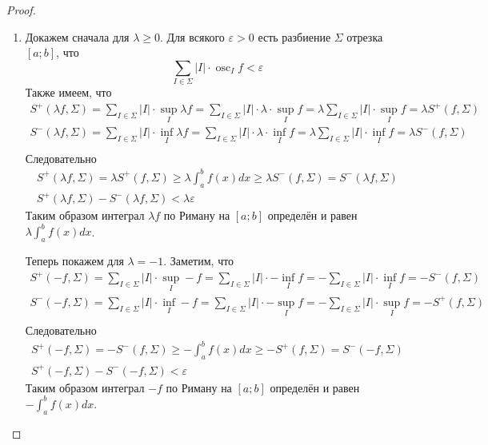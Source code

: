 \documentclass[12pt,a4paper]{article}
\DeclareMathOperator*{\osc}{osc}
\begin{document}
\begin{proof}
\begin{enumerate}
            \item Докажем сначала для $\lambda \geqslant 0$. Для всякого $\varepsilon > 0$ есть разбиение $\Sigma$ отрезка $[a; b]$, что
                \[\sum_{I \in \Sigma} |I| \cdot \osc_I f < \varepsilon\]
                Также имеем, что
                \begin{gather*}
                    S^+(\lambda f, \Sigma) = \sum_{I \in \Sigma} |I| \cdot \sup_I \lambda f = \sum_{I \in \Sigma} |I| \cdot \lambda \cdot \sup_I f = \lambda \sum_{I \in \Sigma} |I| \cdot \sup_I f = \lambda S^+(f, \Sigma)\\
                    S^-(\lambda f, \Sigma) = \sum_{I \in \Sigma} |I| \cdot \inf_I \lambda f = \sum_{I \in \Sigma} |I| \cdot \lambda \cdot \inf_I f = \lambda \sum_{I \in \Sigma} |I| \cdot \inf_I f = \lambda S^-(f, \Sigma)\\
                \end{gather*}
                Следовательно
                \begin{gather*}
                    S^+(\lambda f, \Sigma) = \lambda S^+(f, \Sigma) \geqslant \lambda \int_a^b f(x)dx \geqslant \lambda S^-(f, \Sigma) = S^-(\lambda f, \Sigma)\\
                    S^+(\lambda f, \Sigma) - S^-(\lambda f, \Sigma) < \lambda \varepsilon
                \end{gather*}
                Таким образом интеграл $\lambda f$ по Риману на $[a; b]$ определён и равен $\lambda \int_a^b f(x)dx$.

                Теперь покажем для $\lambda = -1$. Заметим, что
                \begin{gather*}
                    S^+(-f, \Sigma) = \sum_{I \in \Sigma} |I| \cdot \sup_I -f = \sum_{I \in \Sigma} |I| \cdot -\inf_I f = -\sum_{I \in \Sigma} |I| \cdot \inf_I f = -S^-(f, \Sigma)\\
                    S^-(-f, \Sigma) = \sum_{I \in \Sigma} |I| \cdot \inf_I -f = \sum_{I \in \Sigma} |I| \cdot -\sup_I f = -\sum_{I \in \Sigma} |I| \cdot \sup_I f = -S^+(f, \Sigma)\\
                \end{gather*}
                Следовательно
                \begin{gather*}
                    S^+(-f, \Sigma) = -S^-(f, \Sigma) \geqslant -\int_a^b f(x)dx \geqslant -S^+(f, \Sigma) = S^-(-f, \Sigma)\\
                    S^+(-f, \Sigma) - S^-(-f, \Sigma) < \varepsilon
                \end{gather*}
                Таким образом интеграл $-f$ по Риману на $[a; b]$ определён и равен $-\int_a^b f(x)dx$.


\end{enumerate}
\end{proof}
\end{document}

